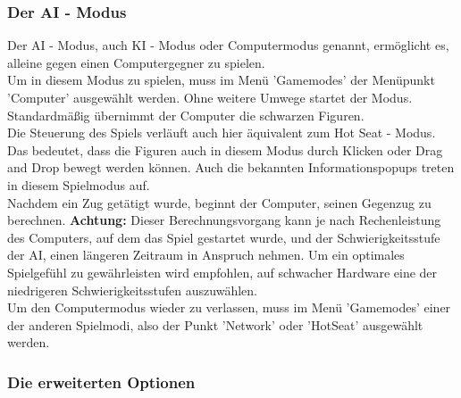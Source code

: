 \documentclass[12pt,a4paper]{article}
\begin{document}
	\subsubsection{Der AI - Modus}
	\label{SUBSUBSEC:USERDOCAI}
	
Der AI - Modus, auch KI - Modus oder Computermodus genannt, ermöglicht es, alleine gegen einen Computergegner zu spielen. \\
Um in diesem Modus zu spielen, muss im Menü 'Gamemodes' der Menüpunkt 'Computer' ausgewählt werden. Ohne weitere Umwege startet der Modus.\\
Standardmäßig übernimmt der Computer die schwarzen Figuren. \\
Die Steuerung des Spiels verläuft auch hier äquivalent zum Hot Seat - Modus. Das bedeutet, dass die Figuren auch in diesem Modus durch Klicken oder Drag and Drop bewegt werden können. Auch die bekannten Informationspopups treten in diesem Spielmodus auf.\\
Nachdem ein Zug getätigt wurde, beginnt der Computer, seinen Gegenzug zu berechnen. \textbf{Achtung:} Dieser Berechnungsvorgang kann je nach Rechenleistung des Computers, auf dem das Spiel gestartet wurde, und der Schwierigkeitsstufe der AI, einen längeren Zeitraum in Anspruch nehmen. Um ein optimales Spielgefühl zu gewährleisten wird empfohlen, auf schwacher Hardware eine der niedrigeren Schwierigkeitsstufen auszuwählen. 
\\Um den Computermodus wieder zu verlassen, muss im Menü 'Gamemodes' einer der anderen Spielmodi, also der Punkt 'Network' oder 'HotSeat' ausgewählt werden. 

	\subsubsection{Die erweiterten Optionen}
	\label{SUBSUBSEC:USERDOCSETUP}
	
\end{document}
